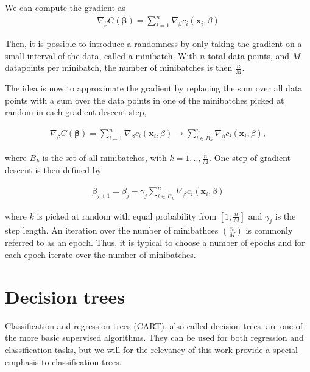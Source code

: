\noindent We can compute the gradient as
\begin{align*}
\nabla_{\beta} C(\boldsymbol{\beta}) =  \sum_{i=1}^{n} \nabla_{\beta} c_i(\boldsymbol{x}_i,\beta)
\end{align*}

\noindent Then, it is possible to introduce a randomness by only taking the gradient on a small interval of the data, called a minibatch. With $n$ total data points, and $M$ datapoints per minibatch, the number of minibatches is then $\frac{n}{M}$.

The idea is now to approximate the gradient by replacing the sum over all data points with a sum over the data points in one of the minibatches picked at random in each gradient descent step,

\begin{align*}
\nabla_{\beta} C(\boldsymbol{\beta}) =  \sum_{i=1}^{n} \nabla_{\beta} c_i(\boldsymbol{x}_i,\beta) \to \sum_{i \in B_k}^{n} \nabla_{\beta} c_i(\boldsymbol{x}_i,\beta),
\end{align*}

 \noindent where $B_k$ is the set of all minibatches, with $k=1, ..,\frac{n}{M}$. One step of gradient descent is then defined by

\begin{align*}
\beta_{j+1} = \beta_j - \gamma_j \sum_{i \in B_k}^{n} \nabla_{\beta} c_i(\boldsymbol{x}_i,\beta)
\end{align*}

\noindent where $k$ is picked at random with equal probability from $[1, \frac{n}{M}]$ and $\gamma_j$ is the step length. An iteration over the number of minibathces $(\frac{n}{M})$ is commonly referred to as an epoch. Thus, it is typical to choose a number of epochs and for each epoch iterate over the number of minibatches. 

\section{Decision trees}
Classification and regression trees (CART), also called decision trees, are one of the more basic supervised algorithms. They can be used for both regression and classification tasks, but we will for the relevancy of this work provide a special emphasis to classification trees.  %

